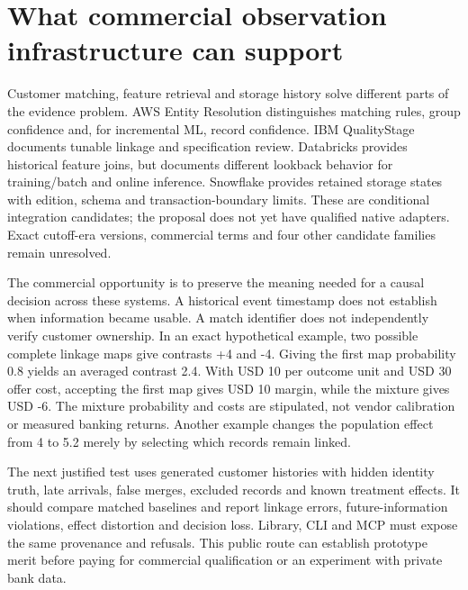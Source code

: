 \hypertarget{what-commercial-observation-infrastructure-can-support}{%
\section{What commercial observation infrastructure can
support}\label{what-commercial-observation-infrastructure-can-support}}

Customer matching, feature retrieval and storage history solve different
parts of the evidence problem. AWS Entity Resolution distinguishes
matching rules, group confidence and, for incremental ML, record
confidence. IBM QualityStage documents tunable linkage and specification
review. Databricks provides historical feature joins, but documents
different lookback behavior for training/batch and online inference.
Snowflake provides retained storage states with edition, schema and
transaction-boundary limits. These are conditional integration
candidates; the proposal does not yet have qualified native adapters.
Exact cutoff-era versions, commercial terms and four other candidate
families remain unresolved.
\cite{exec22_obs_aws_er_manual,exec22_obs_ibm_matching,exec22_obs_databricks_pit,exec22_obs_databricks_feature,exec22_obs_snowflake_time,exec22_obs_snowflake_at}

The commercial opportunity is to preserve the meaning needed for a
causal decision across these systems. A historical event timestamp does
not establish when information became usable. A match identifier does
not independently verify customer ownership. In an exact hypothetical
example, two possible complete linkage maps give contrasts +4 and -4.
Giving the first map probability 0.8 yields an averaged contrast 2.4.
With USD 10 per outcome unit and USD 30 offer cost, accepting the first
map gives USD 10 margin, while the mixture gives USD -6. The mixture
probability and costs are stipulated, not vendor calibration or measured
banking returns. Another example changes the population effect from 4 to
5.2 merely by selecting which records remain linked.
\cite{exec22_obs_reference}

The next justified test uses generated customer histories with hidden
identity truth, late arrivals, false merges, excluded records and known
treatment effects. It should compare matched baselines and report
linkage errors, future-information violations, effect distortion and
decision loss. Library, CLI and MCP must expose the same provenance and
refusals. This public route can establish prototype merit before paying
for commercial qualification or an experiment with private bank data.

